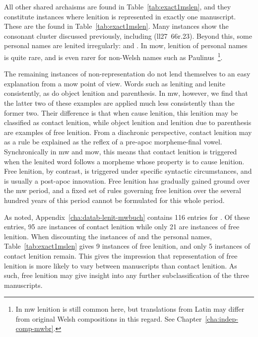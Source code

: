 All other shared archaisms are found in Table~\ref{tab:exact1mslen}, and they constitute instances where lenition is represented in exactly one manuscript. These are the found in Table~\ref{tab:exact1mslen}. Many instances show the consonant cluster  discussed previously, including  (\gls{ll27}~66r.23). Beyond this, some personal names  are lenited irregularly:  and  . In \gls{mow}, lenition of personal names is quite rare, and is even rarer for non-Welsh names such as Paulinus~\autocite[702]{thomas_gramadeg_1996}\footnote{In \gls{mw} lenition is still common here, but translations from Latin may differ from original Welsh compositions in this regard. See Chapter~\ref{cha:indep-comp-mwbr}.}. 

The remaining instances of non-representation do not lend themselves to an easy explanation from a \gls{mow} point of view. Words such as leniting  and  lenite  consistently, as do object lenition and parenthesis. In \gls{mw}, however, we find that the latter two of these examples are applied much less consistently than the former two. Their difference is that when  cause lenition, this lenition may be classified as contact lenition, while object lenition and lenition due to parenthesis are examples of free lenition. From a diachronic perspective, contact lenition may as a rule be explained as the reflex of a pre-\gls{apoc} morpheme-final vowel. Synchronically in \gls{mw} and \gls{mow}, this means that contact lenition is triggered when the lenited word follows a morpheme whose property is to cause lenition. Free lenition, by contrast, is triggered under specific syntactic circumstances, and is usually a post-\gls{apoc} innovation. Free lenition has gradually gained ground over the \gls{mw} period, and a fixed set of rules governing free lenition over the several hundred years of this period cannot be formulated for this whole period. 

As noted, Appendix~\ref{cha:datab-lenit-mwbuch} contains  116 entries for . Of these entries, 95 are instances of contact lenition while only 21 are instances of free lenition. When discounting the instances of  and the personal names, Table~\ref{tab:exact1mslen} gives 9 instances of free lenition, and only 5 instances of contact lenition remain. This gives the impression that representation of free lenition is more likely to vary between manuscripts than contact lenition. As such, free lenition may give insight into any further subclassification of the three manuscripts. 

